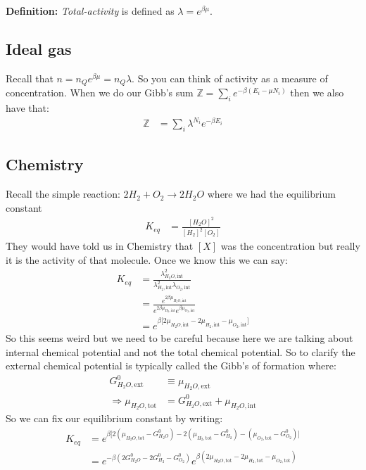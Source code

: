 \documentclass[a4paper, 11pt]{article}
\begin{document}
	\noindent\textbf{Definition:} \textit{Total-activity} is defined as $\lambda = e^{\beta \mu}$.
	
\subsection*{Ideal gas} 
	Recall that $n = n_Qe^{\beta \mu} = n_Q\lambda$. So you can think of activity as a measure of concentration. When we do our Gibb's sum $\mathbb{Z} = \sum_i e^{-\beta(E_i-\mu N_i)}$ then we also have that: 
		\begin{align*}
			\mathbb{Z} &= \sum_i \lambda^{N_i}e^{-\beta E_i}
		\end{align*}
		
\subsection*{Chemistry} 
	Recall the simple reaction: $2 H_2 + O_2 \rightarrow 2H_2 O$ where we had the equilibrium constant
		\begin{align*}
			K_{eq} &= \frac{[H_2O]^2}{[H_2]^2[O_2]}
		\end{align*}
	They would have told us in Chemistry that $[X]$ was the concentration but really it is the activity of that molecule. Once we know this we can say: 
		\begin{align*}
			K_{eq} &= \frac{\lambda_{H_2O, \text{int}}^2}{\lambda_{H_2,\text{int}}^2\lambda_{O_2,\text{int}}} \\ 
				&= \frac{e^{2\beta\mu_{H_2O, \text{int}}}}{e^{2\beta\mu_{H_2, \text{int}}}e^{\beta\mu_{O_2, \text{int}}}} \\ 
				&=e^{\beta\big[2\mu_{H_2O, \text{int}}-2\mu_{H_2, \text{int}}-\mu_{O_2, \text{int}}\big]}
		\end{align*}
	So this seems weird but we need to be careful because here we are talking about internal chemical potential and not the total chemical potential. So to clarify the external chemical potential is typically called the Gibb's of formation where: 
		\begin{align*}
			G_{H_2O,\text{ext}}^0 &\equiv \mu_{H_2O,\text{ext}} \\ 
			\Rightarrow \mu_{H_2O, \text{tot}} &= G_{H_2O,\text{ext}}^0+\mu_{H_2O, \text{int}}
		\end{align*}
	So we can fix our equilibrium constant by writing: 
		\begin{align*}
			K_{eq} &=e^{\beta\big[2(\mu_{H_2O, \text{tot}}-G_{H_2O}^0)-2(\mu_{H_2, \text{tot}}-G_{H_2}^0)-(\mu_{O_2, \text{tot}}-G_{O_2}^0)\big]} \\ 
				&= e^{-\beta(2G_{H_2O}^0-2G_{H_2}^0-G_{O_2}^0)}e^{\beta(2\mu_{H_2O,\text{tot}}-2\mu_{H_2,\text{tot}}-\mu_{O_2,\text{tot}})}
		\end{align*}
\end{document}
